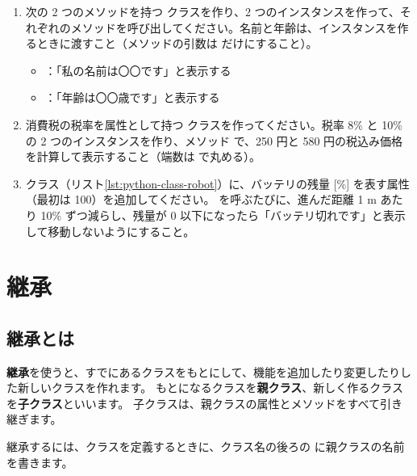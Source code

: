 \begin{exercise}
\begin{enumerate}
  \item 次の 2 つのメソッドを持つ  クラスを作り、2 つのインスタンスを作って、それぞれのメソッドを呼び出してください。名前と年齢は、インスタンスを作るときに渡すこと（メソッドの引数は  だけにすること）。
    \begin{itemize}
      \item {}：「私の名前は〇〇です」と表示する
      \item {}：「年齢は〇〇歳です」と表示する
    \end{itemize}
  \item 消費税の税率を属性として持つ  クラスを作ってください。税率 8\% と 10\% の 2 つのインスタンスを作り、メソッド  で、250 円と 580 円の税込み価格を計算して表示すること（端数は  で丸める）。
  \item {} クラス（リスト\ref{lst:python-class-robot}）に、バッテリの残量 [\%] を表す属性 （最初は 100）を追加してください。 を呼ぶたびに、進んだ距離 1 m あたり 10\% ずつ減らし、残量が 0 以下になったら「バッテリ切れです」と表示して移動しないようにすること。
\end{enumerate}
\end{exercise}

\section{継承}
\label{sec:python-class-inherit}

\subsection{継承とは}

\textbf{継承}を使うと、すでにあるクラスをもとにして、機能を追加したり変更したりした新しいクラスを作れます。
もとになるクラスを\textbf{親クラス}、新しく作るクラスを\textbf{子クラス}といいます。
子クラスは、親クラスの属性とメソッドをすべて引き継ぎます。

継承するには、クラスを定義するときに、クラス名の後ろの \cmd{( )} に親クラスの名前を書きます。

